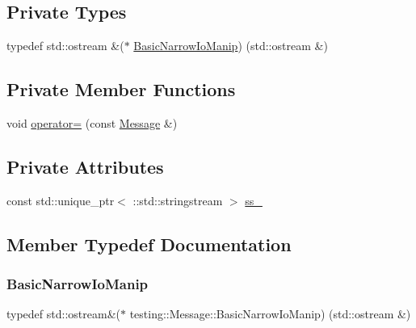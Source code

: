 \subsection*{Private Types}
\begin{DoxyCompactItemize}
\item 
typedef std\+::ostream \&($\ast$ \hyperlink{classtesting_1_1Message_ad398b70e2a11b923cef05c809b0eeb92}{Basic\+Narrow\+Io\+Manip}) (std\+::ostream \&)
\end{DoxyCompactItemize}
\subsection*{Private Member Functions}
\begin{DoxyCompactItemize}
\item 
void \hyperlink{classtesting_1_1Message_a5a0462b539ffb88f15ea0c67977774af}{operator=} (const \hyperlink{classtesting_1_1Message}{Message} \&)
\end{DoxyCompactItemize}
\subsection*{Private Attributes}
\begin{DoxyCompactItemize}
\item 
const std\+::unique\+\_\+ptr$<$ \+::std\+::stringstream $>$ \hyperlink{classtesting_1_1Message_a22a52314ba644b1eda454a82ac1fabd8}{ss\+\_\+}
\end{DoxyCompactItemize}


\subsection{Member Typedef Documentation}
\mbox{\label{classtesting_1_1Message_ad398b70e2a11b923cef05c809b0eeb92}} 
\subsubsection{\texorpdfstring{Basic\+Narrow\+Io\+Manip}{BasicNarrowIoManip}}
{\footnotesize\ttfamily typedef std\+::ostream\&($\ast$ testing\+::\+Message\+::\+Basic\+Narrow\+Io\+Manip) (std\+::ostream \&)\hspace{0.3cm}{\ttfamily [private]}}



